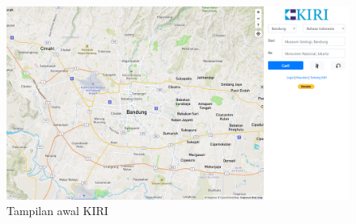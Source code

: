 \documentclass[a4paper,twoside]{article}
\begin{document}
\begin{enumerate}
        \begin{figure}[h] 
    	\centering  
    	\includegraphics[width=1\textwidth]{Gambar/KIRI}  
    	\caption{Tampilan awal KIRI}
    	\label{fig:kiriawal} 
        \end{figure}


\end{enumerate}
\end{document}
